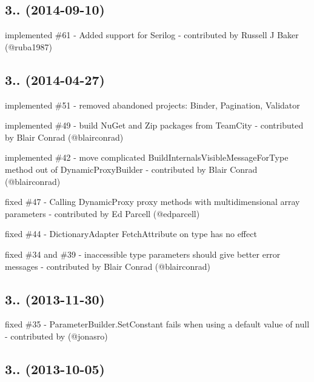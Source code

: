 \subsection*{3.. (2014-\/09-\/10)}


\begin{DoxyItemize}
\item implemented \#61 -\/ Added support for Serilog -\/ contributed by Russell J Baker (@ruba1987)
\end{DoxyItemize}

\subsection*{3.. (2014-\/04-\/27)}


\begin{DoxyItemize}
\item implemented \#51 -\/ removed abandoned projects\+: Binder, Pagination, Validator
\item implemented \#49 -\/ build Nu\+Get and Zip packages from Team\+City -\/ contributed by Blair Conrad (@blairconrad)
\item implemented \#42 -\/ move complicated Build\+Internals\+Visible\+Message\+For\+Type method out of Dynamic\+Proxy\+Builder -\/ contributed by Blair Conrad (@blairconrad)
\item fixed \#47 -\/ Calling Dynamic\+Proxy proxy methods with multidimensional array parameters -\/ contributed by Ed Parcell (@edparcell)
\item fixed \#44 -\/ Dictionary\+Adapter Fetch\+Attribute on type has no effect
\item fixed \#34 and \#39 -\/ inaccessible type parameters should give better error messages -\/ contributed by Blair Conrad (@blairconrad)
\end{DoxyItemize}

\subsection*{3.. (2013-\/11-\/30)}


\begin{DoxyItemize}
\item fixed \#35 -\/ Parameter\+Builder.\+Set\+Constant fails when using a default value of null -\/ contributed by (@jonasro)
\end{DoxyItemize}

\subsection*{3.. (2013-\/10-\/05)}


